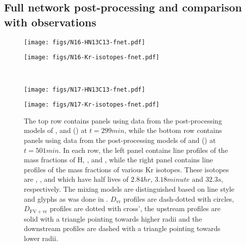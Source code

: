 \documentclass[fleqn,usenatbib]{mnras}
\begin{document}
\subsection{Full network post-processing and comparison with observations}
\label{sec:fulllnetworkresults}

\begin{figure*}

  \begin{minipage}{.49\textwidth}
    \centering
    \texttt{[image: figs/N16-HN13C13-fnet.pdf]}
  \end{minipage}
  \begin{minipage}{.49\textwidth}
    \centering
    \texttt{[image: figs/N16-Kr-isotopes-fnet.pdf]}
  \end{minipage} \\

  \begin{minipage}{.49\textwidth}
    \centering
    \texttt{[image: figs/N17-HN13C13-fnet.pdf]}
  \end{minipage}
  \begin{minipage}{.49\textwidth}
    \centering
    \texttt{[image: figs/N17-Kr-isotopes-fnet.pdf]}
  \end{minipage}
  
  \caption{The top row contains panels using data from the post-processing
          models of ,  and  () at $t =
          \unit{299}{min}$, while the bottom row contains panels using data from the
          post-processing models of  and  () at $t =
          \unit{501}{min}$. In each row, the left panel contains line profiles of the mass
          fractions of H, , and , while the right panel
          contains line profiles of the mass fractions of various Kr isotopes. These
          isotopes are , , and  which have
          half lives of $\unit{2.84}{hr}$, $\unit{3.18}{minute}$ and $\unit{32.3}{s}$,
          respectively. The mixing models are distinguished based on line style and glyphs
          as was done in . $D_{\mathrm{vr}}$
          profiles are dash-dotted with circles, $D_{\mathrm{FV+vr}}$ profiles are dotted
          with cross', the upstream profiles are solid with a triangle pointing towards
          higher radii and the downstream profiles are dashed with a triangle pointing
          towards lower radii.}

  \label{fig:fnet}
\end{figure*}
\end{document}
